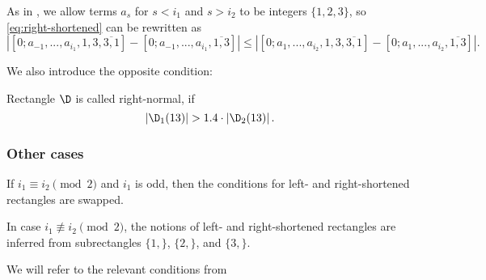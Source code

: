 As in ,
we allow terms $a_s$ for $s < i_1$ and $s > i_2$ to be integers $\{1, 2, 3\}$,
so \ref{eq:right-shortened} can be rewritten as
%
\begin{equation*}
	\left|
		\left[ 0; a_{-1}, ..., a_{i_1}, 1, 3, \overline{3, 1} \right] -
		\left[ 0; a_{-1}, ..., a_{i_1}, \overline{1, 3} \right]
	\right| \leqslant \left|
		\left[ 0; a_{1}, ..., a_{i_2}, 1, 3, \overline{3, 1} \right] -
		\left[ 0; a_{1}, ..., a_{i_2}, \overline{1, 3} \right]
	\right|.
\end{equation*}

We also introduce the opposite condition:

\begin{definition}
	Rectangle $\D$ is called right-normal, if
	\begin{equation}
		\label{eq:right-normal}
		\left| \D_1(13) \right| > 1.4 \cdot \left| \D_2(13) \right|.
	\end{equation}
\end{definition}


\subsubsection{Other cases}

If $i_1 \equiv i_2 \pmod 2$ and $i_1$ is odd,
then the conditions for left- and right-shortened rectangles are swapped.

In case $i_1 \not\equiv i_2 \pmod 2$,
the notions of left- and right-shortened rectangles
are inferred from subrectangles $\{1,\}$, $\{2,\}$, and $\{3,\}$.

We will refer to the relevant conditions from 
